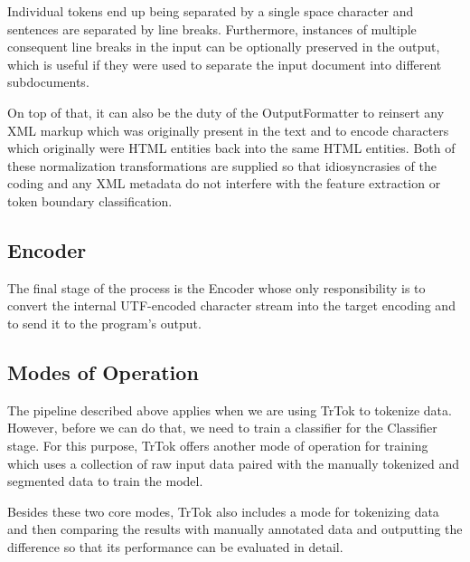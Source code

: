 Individual tokens end up being separated by a single space character
and sentences are separated by line breaks. Furthermore, instances of
multiple consequent line breaks in the input can be optionally
preserved in the output, which is useful if they were used to separate
the input document into different subdocuments.

On top of that, it can also be the duty of the OutputFormatter to
reinsert any XML markup which was originally present in the text and
to encode characters which originally were HTML entities back into the
same HTML entities. Both of these normalization transformations are
supplied so that idiosyncrasies of the coding and any XML metadata do
not interfere with the feature extraction or token boundary
classification.

\subsection{Encoder}

The final stage of the process is the Encoder whose only
responsibility is to convert the internal UTF-encoded character
stream into the target encoding and to send it to the program's output.

\subsection{Modes of Operation}

The pipeline described above applies when we are using TrTok to
tokenize data. However, before we can do that, we need to train a
classifier for the Classifier stage. For this purpose, TrTok offers
another mode of operation for training which uses a collection of raw
input data paired with the manually tokenized and segmented data to
train the model.

Besides these two core modes, TrTok also includes a mode for
tokenizing data and then comparing the results with manually annotated
data and outputting the difference so that its performance can be
evaluated in detail.
